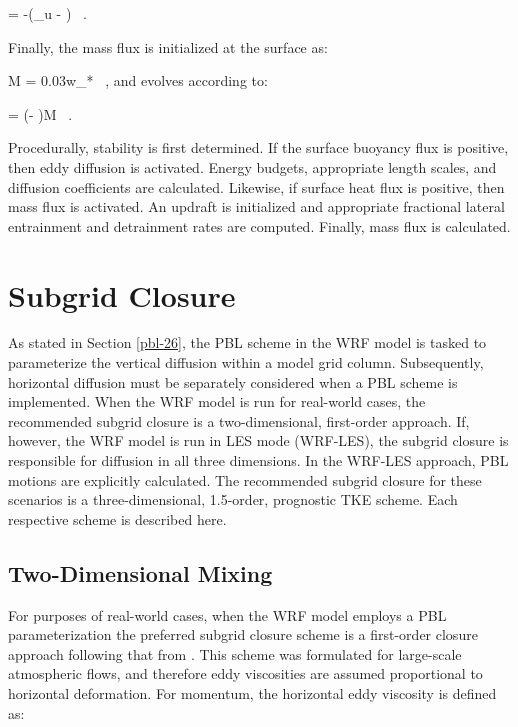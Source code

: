 \be
{} = -\gamma (\phi_u - \phi) \, . \label{equation365}
\ee


Finally, the mass flux is initialized at the surface as:

\be
M = 0.03w_* \, , \label{equation366}
\ee
\noindent
 and evolves according to:

\be
{} = (\gamma - \delta)M \, . \label{equation367}
\ee


Procedurally, stability is first determined. If the surface buoyancy flux is positive, then eddy diffusion is activated. Energy budgets, appropriate length scales, and diffusion coefficients are calculated. Likewise, if surface heat flux is positive, then mass flux is activated. An updraft is initialized and appropriate fractional lateral entrainment and detrainment rates are computed. Finally, mass flux is calculated.

\section{Subgrid Closure}
\label{sg-close-37}

As stated in Section \autoref{pbl-26}, the PBL scheme in the WRF model is tasked to parameterize the vertical diffusion within a model grid column. Subsequently, horizontal diffusion must be separately considered when a PBL scheme is implemented. When the WRF model is run for real-world cases, the recommended subgrid closure is a two-dimensional, first-order approach. If, however, the WRF model is run in LES mode (WRF-LES), the subgrid closure is responsible for diffusion in all three dimensions. In the WRF-LES approach, PBL motions are explicitly calculated. The recommended subgrid closure for these scenarios is a three-dimensional, 1.5-order, prognostic TKE scheme. Each respective scheme is described here.

\subsection{Two-Dimensional Mixing}
\label{twod-mix-371}

For purposes of real-world cases, when the WRF model employs a PBL parameterization the preferred subgrid closure scheme is a first-order closure approach following that from  \citet{Smag}. This scheme was formulated for large-scale atmospheric flows, and therefore eddy viscosities are assumed proportional to horizontal deformation. For momentum, the horizontal eddy viscosity is defined as:

